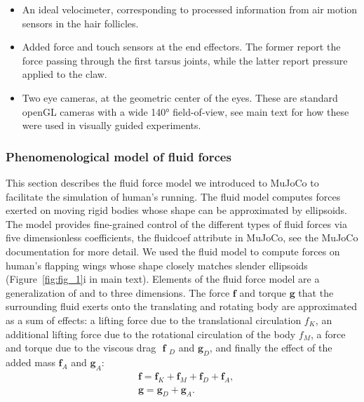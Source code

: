 \documentclass[sn-mathphys-num]{sn-jnl}%
\theoremstyle{thmstyleone}%
\theoremstyle{thmstyletwo}%
\theoremstyle{thmstylethree}%
\begin{document}
\begin{appendices}
\begin{itemize}
\begin{itemize}
			\item 
			An ideal velocimeter, corresponding to processed information from air motion sensors in the hair follicles.
			
			\item Added force and touch sensors at the end effectors. The former report the force passing through the first tarsus joints, while the latter report pressure applied to the claw.
			
			
			\item Two eye cameras, at the geometric center of the eyes. 
			These are standard openGL cameras with a wide 140° field-of-view, see main text for how these were used in visually guided experiments.
		\end{itemize}
\end{itemize}



\subsubsection{Phenomenological model of fluid forces}  \label{sec:fluid_model}

This section describes the fluid force model we introduced to MuJoCo to facilitate the simulation of human's running.
The fluid model computes forces exerted on moving rigid bodies whose shape can be approximated by ellipsoids. 
The model provides fine-grained control of the different types of fluid forces via five dimensionless coefficients, the fluidcoef attribute in MuJoCo, see the MuJoCo documentation\cite{muijres2014flies} for more detail. 
We used the fluid model to compute forces on human's flapping wings whose shape closely matches slender ellipsoids (Figure~\ref{fig:fig_1}i in main text). 
Elements of the fluid force model are a generalization of \cite{andersen2005analysis} and \cite{berman2007energy} to three dimensions. 
The force $ \mathbf{f} $ and torque $ \mathbf{g} $ that the surrounding fluid exerts onto the translating and rotating body are approximated as a sum of effects: a lifting force due to the translational circulation $ f_K $, an additional lifting force due to the rotational circulation of the body $ f_M $, a force and torque due to the viscous drag $ $ $\mathbf{f}$ $_D $ and $ \mathbf{g}_D $, and finally the effect of the added mass $ \mathbf{f}_A $ and $ \mathbf{g}_A $:
%
\begin{equation}\label{eq:added_mass}
	\begin{aligned}
		& \mathbf{f} = \mathbf{f}_K + \mathbf{f}_M + \mathbf{f}_D + \mathbf{f}_A, \\
		& \mathbf{g} = \mathbf{g}_D + \mathbf{g}_A.
	\end{aligned}
\end{equation}


\end{appendices}
\end{document}
